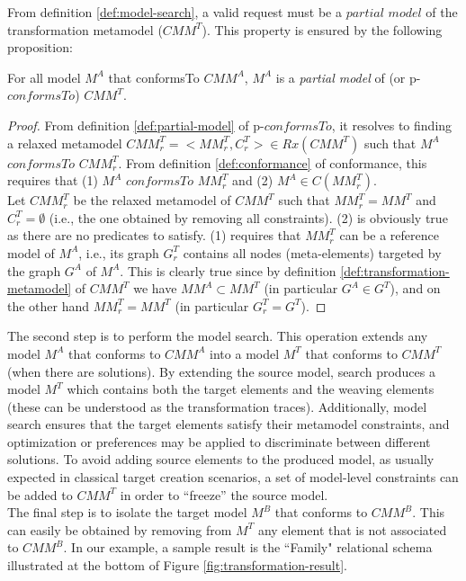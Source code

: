 \documentclass{llncs}
\begin{document}
%
From definition \ref{def:model-search}, a valid request must be a $partial$ $model$ of the transformation
metamodel ($CMM^T$). This property is ensured by the following proposition:
%
\begin{proposition} For all model $M^A$ that conformsTo $CMM^A$,
$M^A$ is a \emph{partial model} of (or p-$conformsTo$) $CMM^T$.
\end{proposition}
%
\begin{proof} From definition \ref{def:partial-model} of p-$conformsTo$, it
resolves to finding a relaxed metamodel $CMM^T_r = <MM^T_r,C^T_r> \in Rx(CMM^T)$ such that $M^A$ $conformsTo$ $CMM^T_r$. From definition \ref{def:conformance} of conformance, this requires that (1) $M^A$ $conformsTo$ $MM^T_r$ and (2) $M^A \in C(MM^T_r)$.\\
Let $CMM^T_r$ be the relaxed metamodel of $CMM^T$ such that $MM^T_r = MM^T$ and $C^T_r = \emptyset$ (i.e., the one obtained by removing all constraints). (2) is obviously true as there are no predicates to satisfy. (1) requires that $MM^T_r$ can be a reference model of $M^A$, i.e., its graph $G^T_r$ contains all nodes (meta-elements) targeted by the graph $G^A$ of $M^A$. This is clearly true since by definition \ref{def:transformation-metamodel} of $CMM^T$ we have $MM^A \subset MM^T$ (in particular $G^A \in G^T$), and on the other hand $MM^T_r = MM^T$ (in particular $G^T_r = G^T$).
\end{proof}

The second step is to perform the model search. This operation extends any model $M^A$ that conforms to $CMM^A$ into a model $M^T$ that conforms to $CMM^T$ (when there are solutions). By extending the source model, search produces a model $M^T$ which contains both the target elements and the weaving elements (these can be understood as the transformation traces). Additionally, model search ensures that the target elements satisfy their metamodel constraints, and optimization or preferences may be applied to discriminate between different solutions. To avoid adding source elements to the produced model, as usually expected in classical target creation scenarios, a set of model-level constraints can be added to $CMM^T$ in order to ``freeze'' the source model.\\
%
The final step is to isolate the target model $M^B$ that conforms to $CMM^B$. This can
easily be obtained by removing from $M^T$ any element that is not associated to $CMM^B$. In our example, a sample result is the ``Family" relational schema illustrated at the bottom of Figure \ref{fig:transformation-result}.
%
\end{document}
